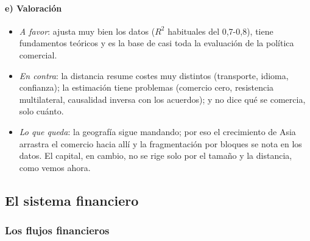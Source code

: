 \documentclass[11pt]{article}
\begin{document}
\paragraph{e) Valoración}

\begin{itemize}
\item \emph{A favor}: ajusta muy bien los datos ($R^2$ habituales del 0,7-0,8), tiene fundamentos teóricos y es la base de casi toda la evaluación de la política comercial.
\item \emph{En contra}: la distancia resume costes muy distintos (transporte, idioma, confianza); la estimación tiene problemas (comercio cero, resistencia multilateral, causalidad inversa con los acuerdos); y no dice qué se comercia, solo cuánto.
\item \emph{Lo que queda}: la geografía sigue mandando; por eso el crecimiento de Asia arrastra el comercio hacia allí y la fragmentación por bloques se nota en los datos. El capital, en cambio, no se rige solo por el tamaño y la distancia, como vemos ahora.
\end{itemize}

\subsection{El sistema financiero}\label{sec:financiero}

\subsubsection{Los flujos financieros}\label{sec:financieros}
\end{document}

